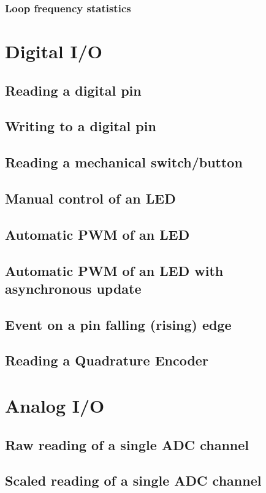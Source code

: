 \documentclass[12pt,letterpaper,article]{memoir} %
\begin{document}
\subsubsection{Loop frequency statistics}

\section{Digital I/O}
\subsection{Reading a digital pin}
\subsection{Writing to a digital pin}
\subsection{Reading a mechanical switch/button}
\subsection{Manual control of an LED}
\subsection{Automatic PWM of an LED}
\subsection{Automatic PWM of an LED with asynchronous update}
\subsection{Event on a pin falling (rising) edge}
\subsection{Reading a Quadrature Encoder}

\section{Analog I/O}
\subsection{Raw reading of a single ADC channel}
\subsection{Scaled reading of a single ADC channel}
\end{document}
